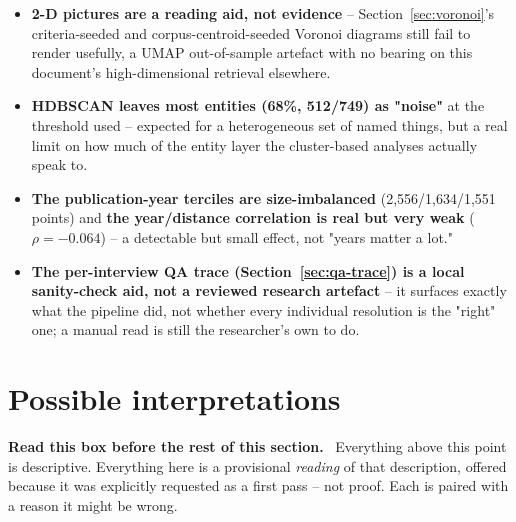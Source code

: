 \documentclass[11pt,a4paper]{article}
\newenvironment{plainbox}[1][Note]
  {\par\vspace{6pt}\noindent{\color{noteline}\rule{\linewidth}{0.6pt}}\par\vspace{3pt}
   \noindent\small\textbf{#1.}\ \ignorespaces}
  {\par\vspace{3pt}\noindent{\color{noteline}\rule{\linewidth}{0.6pt}}\vspace{6pt}\par}
\begin{document}
\begin{itemize}[leftmargin=1.4em]
  "first thing they thought of" signal.
  \item \textbf{2-D pictures are a reading aid, not evidence} --
  Section~\ref{sec:voronoi}'s criteria-seeded and corpus-centroid-seeded
  Voronoi diagrams still fail to render usefully, a UMAP out-of-sample
  artefact with no bearing on this document's high-dimensional retrieval
  elsewhere.
  \item \textbf{HDBSCAN leaves most entities (68\%, 512/749) as "noise"}
  at the threshold used -- expected for a heterogeneous set of named
  things, but a real limit on how much of the entity layer the
  cluster-based analyses actually speak to.
  \item \textbf{The publication-year terciles are size-imbalanced}
  (2,556/1,634/1,551 points) and \textbf{the year/distance correlation
  is real but very weak} ($\rho=-0.064$) -- a detectable but small
  effect, not "years matter a lot."
  \item \textbf{The per-interview QA trace (Section~\ref{sec:qa-trace})
  is a local sanity-check aid, not a reviewed research artefact} -- it
  surfaces exactly what the pipeline did, not whether every individual
  resolution is the "right" one; a manual read is still the researcher's
  own to do.
\end{itemize}

\section{Possible interpretations}
\label{sec:interpretation}

\begin{plainbox}[Read this box before the rest of this section]
Everything above this point is descriptive. Everything here is a
provisional \emph{reading} of that description, offered because it was
explicitly requested as a first pass -- not proof. Each is paired with a
reason it might be wrong.
\end{plainbox}
\end{document}
